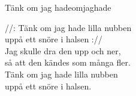 \begin{song}{Tänk om jag hade}{omjaghade}
\begin{vers}
//: Tänk om jag hade lilla nubben\\
uppå ett snöre i halsen ://\\
Jag skulle dra den upp och ner,\\
så att den kändes som många fler.\\
Tänk om jag hade lilla nubben\\
uppå ett snöre i halsen.\\
\end{vers}
\end{song}
